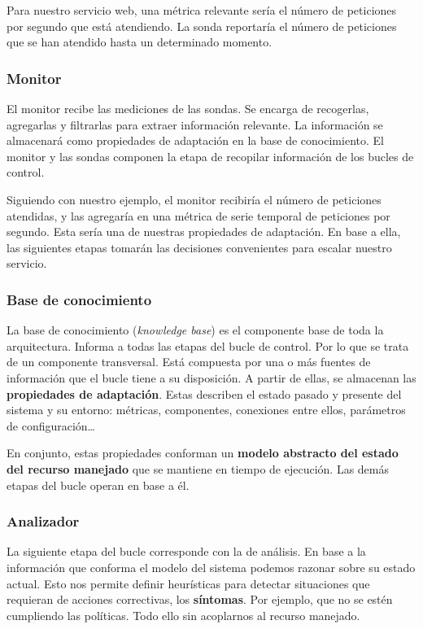 Para nuestro servicio web, una métrica relevante sería el número de peticiones por segundo que está atendiendo. La sonda reportaría el número de peticiones que se han atendido hasta un determinado momento.

\subsubsection{Monitor}

El monitor recibe las mediciones de las sondas. Se encarga de recogerlas, agregarlas y filtrarlas para extraer información relevante. La información se almacenará como propiedades de adaptación en la base de conocimiento.\cite{fonsEspecificacionSistemasAutoadaptativos2021} El monitor y las sondas componen la etapa de recopilar información de los bucles de control.

Siguiendo con nuestro ejemplo, el monitor recibiría el número de peticiones atendidas, y las agregaría en una métrica de serie temporal de peticiones por segundo. Esta sería una de nuestras propiedades de adaptación. En base a ella, las siguientes etapas tomarán las decisiones convenientes para escalar nuestro servicio.

\subsubsection{Base de conocimiento}

La base de conocimiento (\emph{knowledge base}) es el componente base de toda la arquitectura. Informa a todas las etapas del bucle de control. Por lo que se trata de un componente transversal. Está compuesta por una o más fuentes de información que el bucle tiene a su disposición. A partir de ellas, se almacenan las \textbf{propiedades de adaptación}. Estas describen el estado pasado y presente del sistema y su entorno: métricas, componentes, conexiones entre ellos, parámetros de configuración\dots

En conjunto, estas propiedades conforman un \textbf{modelo abstracto del estado del recurso manejado} que se mantiene en tiempo de ejecución. \cite{garlanIncreasingSystemDependability2003} Las demás etapas del bucle operan en base a él.

\subsubsection{Analizador}

La siguiente etapa del bucle corresponde con la de análisis. En base a la información que conforma el modelo del sistema podemos razonar sobre su estado actual. Esto nos permite definir heurísticas para detectar situaciones que requieran de acciones correctivas, los \textbf{síntomas}. \cite{brunEngineeringSelfAdaptiveSystems2009} Por ejemplo, que no se estén cumpliendo las políticas. Todo ello sin acoplarnos al recurso manejado.

